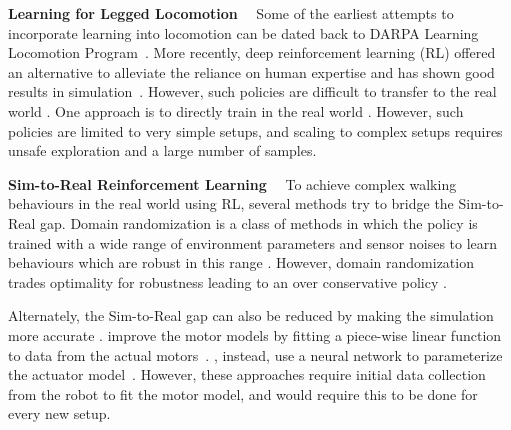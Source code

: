 \documentclass[conference]{IEEEtran}
\begin{document}
\vspace{0.6em}\noindent\textbf{Learning for Legged Locomotion}$\quad$ 
Some of the earliest attempts to incorporate learning into locomotion can be dated back to DARPA Learning Locomotion Program~\cite{zucker2010optimization,zucker2011optimization,ratliff2009chomp,zico2011stanford,kalakrishnan2010fast}. More recently, deep reinforcement learning (RL) offered an alternative to alleviate the reliance on human expertise and has shown good results in simulation~\cite{schulman2017proximal,lillicrap2016continuous,mnih2016asynchronous,fujimoto2018addressing}. However, such policies are difficult to transfer to the real world \cite{koos2010crossing,neunert2017off,boeing2012leveraging}. One approach is to directly train in the real world \cite{haarnoja2019learningtowalk,yang2020data}. However, such policies are limited to very simple setups, and scaling to complex setups requires unsafe exploration and a large number of samples. 

\vspace{0.6em}\noindent\textbf{Sim-to-Real Reinforcement Learning}$\quad$
To achieve complex walking behaviours in the real world using RL, several methods try to bridge the Sim-to-Real gap. Domain randomization is a class of methods in which the policy is trained with a wide range of environment parameters and sensor noises to learn behaviours which are robust in this range \cite{tan2018sim,tobin2017domain,peng2018sim,xie2020dynamics,nachum2020multi}. However, domain randomization trades optimality for robustness leading to an over conservative policy \cite{luo2017robust}.

Alternately, the Sim-to-Real gap can also be reduced by making the simulation more accurate \cite{hwangbo2019learning,tan2018sim,hanna2017grounded}. \citet{tan2018sim} improve the motor models by fitting a piece-wise linear function to data from the actual motors~\cite{tan2018sim}. \citet{hwangbo2019learning}, instead, use a neural network to parameterize the actuator model~\cite{hwangbo2019learning,lee2020learning}. However, these approaches require initial data collection from the robot to fit the motor model, and would require this to be done for every new setup. 
\end{document}
